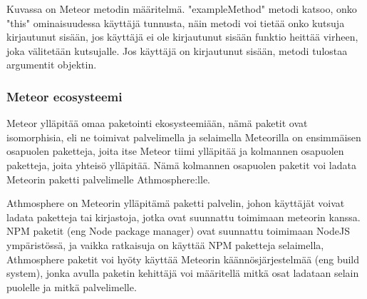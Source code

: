 Kuvassa on Meteor metodin määritelmä. "exampleMethod"{} metodi katsoo, onko "this"{} ominaisuudessa käyttäjä tunnusta, 
näin metodi voi tietää onko kutsuja kirjautunut sisään,
jos käyttäjä ei ole kirjautunut sisään funktio heittää virheen, joka välitetään kutsujalle.
Jos käyttäjä on kirjautunut sisään, metodi tulostaa argumentit objektin. 
\medskip




\subsubsection{Meteor ecosysteemi}



Meteor ylläpitää omaa paketointi ekosysteemiään, 
nämä paketit ovat isomorphisia, eli ne toimivat palvelimella ja selaimella 
Meteorilla on ensimmäisen osapuolen paketteja, joita itse Meteor tiimi ylläpitää ja kolmannen osapuolen paketteja,
joita yhteisö ylläpitää. Nämä kolmannen osapuolen paketit voi ladata Meteorin paketti palvelimelle Athmosphere:lle. 
\medskip


Athmosphere on Meteorin ylläpitämä paketti palvelin, johon käyttäjät voivat ladata paketteja tai kirjastoja, jotka ovat suunnattu toimimaan meteorin kanssa.
NPM paketit (eng Node package manager) ovat suunnattu toimimaan NodeJS ympäristössä, ja vaikka ratkaisuja on käyttää NPM paketteja selaimella, 
Athmosphere paketit voi hyöty käyttää Meteorin käännösjärjestelmää (eng build system), jonka avulla paketin kehittäjä voi määritellä mitkä osat ladataan selain puolelle ja mitkä palvelimelle.

